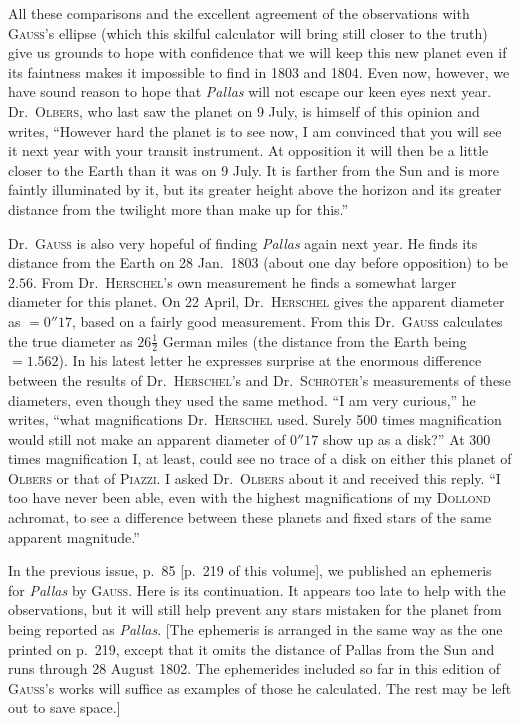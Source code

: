 All these comparisons and the excellent agreement of the observations with \textsc{Gauss}’s ellipse (which this skilful calculator will bring still closer to the truth) give us grounds to hope with confidence that we will keep this new planet even if its faintness makes it impossible to find in 1803 and 1804. Even now, however, we have sound reason to hope that \textit{Pallas} will not escape our keen eyes next year. Dr.\ \textsc{Olbers}, who last saw the planet on 9 July, is himself of this opinion and writes, “However hard the planet is to see now, I am convinced that you will see it next year with your transit instrument. At opposition it will then be a little closer to the Earth than it was on 9 July. It is farther from the Sun and is more faintly illuminated by it, but its greater height above the horizon and its greater distance from the twilight more than make up for this.”

Dr.\ \textsc{Gauss} is also very hopeful of finding \textit{Pallas} again next year. He finds its distance from the Earth on 28 Jan.\ 1803 (about one day before opposition) to be $2.56$. From Dr.\ \textsc{Herschel}’s own measurement he finds a somewhat larger diameter for this planet. On 22 April, Dr.\ \textsc{Herschel} gives the apparent diameter as $=0''17$, based on a fairly good measurement. From this Dr.\ \textsc{Gauss} calculates the true diameter as $26\frac{1}{2}$ German miles (the distance from the Earth being $=1.562$). In his latest letter he expresses surprise at the enormous difference between the results of Dr.\ \textsc{Herschel}’s and Dr.\ \textsc{Schröter}’s measurements of these diameters, even though they used the same method. “I am very curious,” he writes, “what magnifications Dr.\ \textsc{Herschel} used. Surely 500 times magnification would still not make an apparent diameter of $0''17$ show up as a disk?” At 300 times magnification I, at least, could see no trace of a disk on either this planet of \textsc{Olbers} or that of \textsc{Piazzi}. I asked Dr.\ \textsc{Olbers} about it and received this reply. “I too have never been able, even with the highest magnifications of my \textsc{Dollond} achromat, to see a difference between these planets and fixed stars of the same apparent magnitude.”

In the previous issue, p.\ 85 [p.\ 219 of this volume], we published an ephemeris for \textit{Pallas} by \textsc{Gauss}. Here is its continuation. It appears too late to help with the observations, but it will still help prevent any stars mistaken for the planet from being reported as \textit{Pallas}. [The ephemeris is arranged in the same way as the one printed on p.\ 219, except that it omits the distance of Pallas from the Sun and runs through 28 August 1802. The ephemerides included so far in this edition of \textsc{Gauss}’s works will suffice as examples of those he calculated. The rest may be left out to save space.]
